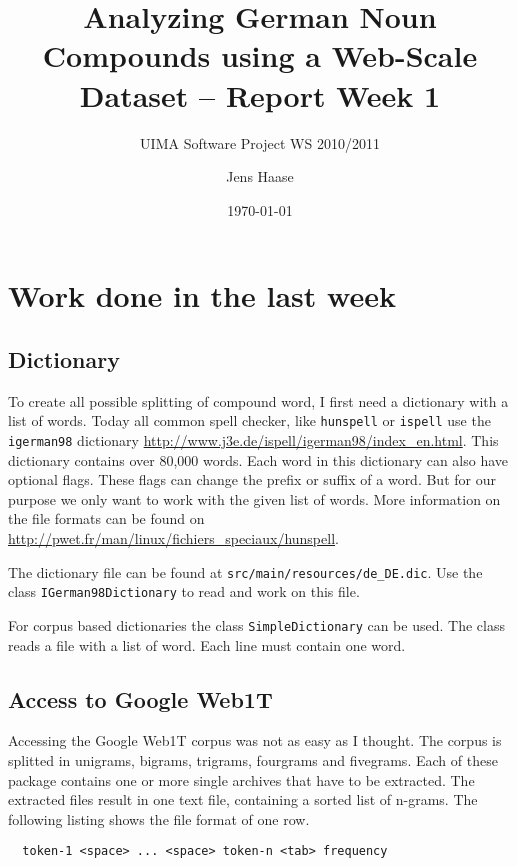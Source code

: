 \documentclass[11pt, accentcolor=tud9b, nochapname]{tudexercise}
\begin{document}
\author{Jens Haase} \title{Analyzing German Noun Compounds using a
  Web-Scale Dataset -- Report Week 1} \subtitle{UIMA Software Project
  WS 2010/2011}  \date{\today}
\maketitle

\section{Work done in the last week}

\subsection{Dictionary}
To create all possible splitting of compound word, I first need a
dictionary with a list of words. Today all common spell checker, like
\texttt{hunspell} or \texttt{ispell} use the \texttt{igerman98} dictionary
\url{http://www.j3e.de/ispell/igerman98/index_en.html}. This
dictionary contains over 80,000 words. Each word in this dictionary
can also have optional flags. These flags can change the prefix or
suffix of a word. But for our purpose we only want to work with the
given list of words. More information on the file formats can be found
on \url{http://pwet.fr/man/linux/fichiers_speciaux/hunspell}.

The dictionary file can be found at \texttt{src/main/resources/de\_DE.dic}. Use
the class \texttt{IGerman98Dictionary} to read and work on this file.

For corpus based dictionaries the class \texttt{SimpleDictionary} can be
used. The class reads a file with a list of word. Each line must
contain one word.

\subsection{Access to Google Web1T}
Accessing the Google Web1T corpus was not as easy as I thought. The
corpus is splitted in unigrams, bigrams, trigrams, fourgrams and
fivegrams. Each of these package contains one or more single archives
that have to be extracted. The extracted files result in one text
file, containing a sorted list of n-grams. The following listing shows
the file format of one row.

\begin{lstlisting}
  token-1 <space> ... <space> token-n <tab> frequency
\end{lstlisting}
\end{document}
